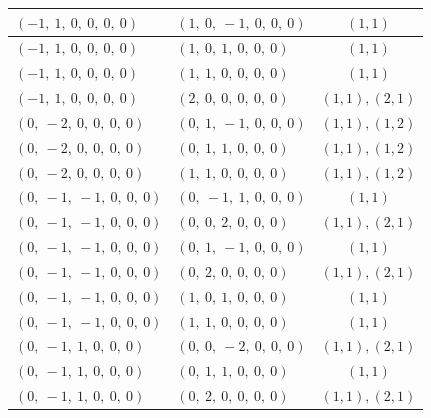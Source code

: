 \documentclass[11pt]{article}
\theoremstyle{definition}
\begin{document}
\begin{center}
\begin{tabular}{|l|l|c|}
    \hline
    $\left( -1, \  1, \  0, \  0, \  0, \  0\right)$ & $\left( 1, \  0, \  -1, \  0, \  0, \  0\right)$ & $(1,1)$ \\
    \hline
    $\left( -1, \  1, \  0, \  0, \  0, \  0\right)$ & $\left( 1, \  0, \  1, \  0, \  0, \  0\right)$ & $(1,1)$ \\
    \hline
    $\left( -1, \  1, \  0, \  0, \  0, \  0\right)$ & $\left( 1, \  1, \  0, \  0, \  0, \  0\right)$ & $(1,1)$ \\
    \hline
    $\left( -1, \  1, \  0, \  0, \  0, \  0\right)$ & $\left( 2, \  0, \  0, \  0, \  0, \  0\right)$ & $(1,1), (2,1)$ \\
    \hline
    $\left( 0, \  -2, \  0, \  0, \  0, \  0\right)$ & $\left( 0, \  1, \  -1, \  0, \  0, \  0\right)$ & $(1,1), (1,2)$ \\
    \hline
    $\left( 0, \  -2, \  0, \  0, \  0, \  0\right)$ & $\left( 0, \  1, \  1, \  0, \  0, \  0\right)$ & $(1,1), (1,2)$ \\
    \hline
    $\left( 0, \  -2, \  0, \  0, \  0, \  0\right)$ & $\left( 1, \  1, \  0, \  0, \  0, \  0\right)$ & $(1,1), (1,2)$ \\
    \hline
    $\left( 0, \  -1, \  -1, \  0, \  0, \  0\right)$ & $\left( 0, \  -1, \  1, \  0, \  0, \  0\right)$ & $(1,1)$ \\
    \hline
    $\left( 0, \  -1, \  -1, \  0, \  0, \  0\right)$ & $\left( 0, \  0, \  2, \  0, \  0, \  0\right)$ & $(1,1), (2,1)$ \\
    \hline
    $\left( 0, \  -1, \  -1, \  0, \  0, \  0\right)$ & $\left( 0, \  1, \  -1, \  0, \  0, \  0\right)$ & $(1,1)$ \\
    \hline
    $\left( 0, \  -1, \  -1, \  0, \  0, \  0\right)$ & $\left( 0, \  2, \  0, \  0, \  0, \  0\right)$ & $(1,1), (2,1)$ \\
    \hline
    $\left( 0, \  -1, \  -1, \  0, \  0, \  0\right)$ & $\left( 1, \  0, \  1, \  0, \  0, \  0\right)$ & $(1,1)$ \\
    \hline
    $\left( 0, \  -1, \  -1, \  0, \  0, \  0\right)$ & $\left( 1, \  1, \  0, \  0, \  0, \  0\right)$ & $(1,1)$ \\
    \hline
    $\left( 0, \  -1, \  1, \  0, \  0, \  0\right)$ & $\left( 0, \  0, \  -2, \  0, \  0, \  0\right)$ & $(1,1), (2,1)$ \\
    \hline
    $\left( 0, \  -1, \  1, \  0, \  0, \  0\right)$ & $\left( 0, \  1, \  1, \  0, \  0, \  0\right)$ & $(1,1)$ \\
    \hline
    $\left( 0, \  -1, \  1, \  0, \  0, \  0\right)$ & $\left( 0, \  2, \  0, \  0, \  0, \  0\right)$ & $(1,1), (2,1)$ \\

\end{tabular}
\end{center}
\end{document}
